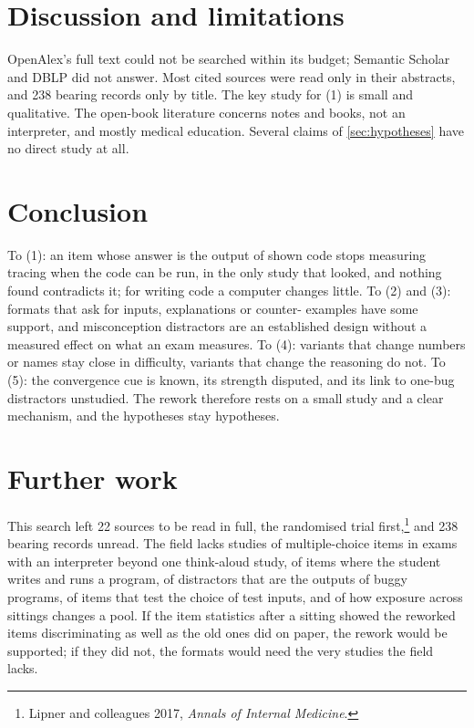 \section{Discussion and limitations}
\label{sec:komplement-discussion}

OpenAlex's full text could not be searched within its budget; Semantic
Scholar and DBLP did not answer.  Most cited sources were read only in
their abstracts, and 238 bearing records only by title.  The key study for
(1) is small and qualitative.  The open-book literature concerns notes
and books, not an interpreter, and mostly medical education.  Several
claims of \cref{sec:hypotheses} have no direct study at all.

\section{Conclusion}
\label{sec:komplement-conclusion}

To (1): an item whose answer is the output of shown code stops measuring
tracing when the code can be run, in the only study that looked, and
nothing found contradicts it; for writing code a computer changes little.
To (2) and (3): formats that ask for inputs, explanations or counter-
examples have some support, and misconception distractors are an
established design without a measured effect on what an exam measures.
To (4): variants that change numbers or names stay close in difficulty,
variants that change the reasoning do not.  To (5): the convergence cue
is known, its strength disputed, and its link to one-bug distractors
unstudied.  The rework therefore rests on a small study and a clear
mechanism, and the hypotheses stay hypotheses.

\section{Further work}
\label{sec:komplement-further}

This search left 22 sources to be read in full, the randomised trial
first,\footnote{Lipner and colleagues 2017,
\emph{Annals of Internal Medicine}.} and 238 bearing records unread.  The
field lacks studies of multiple-choice items in exams with an interpreter
beyond one think-aloud study, of items where the student writes and runs
a program, of distractors that are the outputs of buggy programs, of
items that test the choice of test inputs, and of how exposure across
sittings changes a pool.  If the item statistics after a sitting showed
the reworked items discriminating as well as the old ones did on paper,
the rework would be supported; if they did not, the formats would need
the very studies the field lacks.

